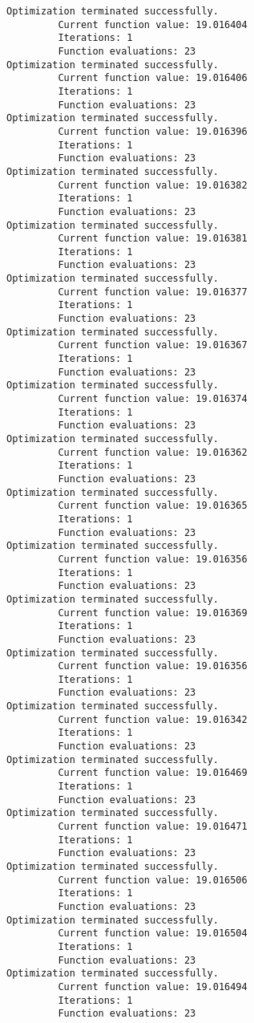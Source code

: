 \documentclass[11pt]{article}
\begin{document}
\begin{Verbatim}[commandchars=\\\{\}]
Optimization terminated successfully.
         Current function value: 19.016404
         Iterations: 1
         Function evaluations: 23
Optimization terminated successfully.
         Current function value: 19.016406
         Iterations: 1
         Function evaluations: 23
Optimization terminated successfully.
         Current function value: 19.016396
         Iterations: 1
         Function evaluations: 23
Optimization terminated successfully.
         Current function value: 19.016382
         Iterations: 1
         Function evaluations: 23
Optimization terminated successfully.
         Current function value: 19.016381
         Iterations: 1
         Function evaluations: 23
Optimization terminated successfully.
         Current function value: 19.016377
         Iterations: 1
         Function evaluations: 23
Optimization terminated successfully.
         Current function value: 19.016367
         Iterations: 1
         Function evaluations: 23
Optimization terminated successfully.
         Current function value: 19.016374
         Iterations: 1
         Function evaluations: 23
Optimization terminated successfully.
         Current function value: 19.016362
         Iterations: 1
         Function evaluations: 23
Optimization terminated successfully.
         Current function value: 19.016365
         Iterations: 1
         Function evaluations: 23
Optimization terminated successfully.
         Current function value: 19.016356
         Iterations: 1
         Function evaluations: 23
Optimization terminated successfully.
         Current function value: 19.016369
         Iterations: 1
         Function evaluations: 23
Optimization terminated successfully.
         Current function value: 19.016356
         Iterations: 1
         Function evaluations: 23
Optimization terminated successfully.
         Current function value: 19.016342
         Iterations: 1
         Function evaluations: 23
Optimization terminated successfully.
         Current function value: 19.016469
         Iterations: 1
         Function evaluations: 23
Optimization terminated successfully.
         Current function value: 19.016471
         Iterations: 1
         Function evaluations: 23
Optimization terminated successfully.
         Current function value: 19.016506
         Iterations: 1
         Function evaluations: 23
Optimization terminated successfully.
         Current function value: 19.016504
         Iterations: 1
         Function evaluations: 23
Optimization terminated successfully.
         Current function value: 19.016494
         Iterations: 1
         Function evaluations: 23

\end{Verbatim}
\end{document}
